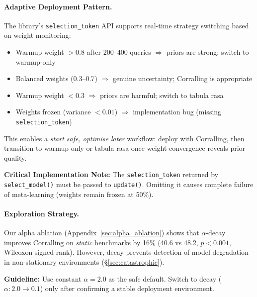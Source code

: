 \paragraph{Adaptive Deployment Pattern.}
The library's \texttt{selection\_token} API supports real-time
strategy switching based on weight monitoring:

\begin{itemize}[nosep]
    \item Warmup weight ${>}0.8$ after 200--400 queries
          $\Rightarrow$ priors are strong; switch to warmup-only
    \item Balanced weights ($0.3$--$0.7$) $\Rightarrow$ genuine
          uncertainty; Corralling is appropriate
    \item Warmup weight ${<}0.3$ $\Rightarrow$ priors are harmful;
          switch to tabula rasa
    \item Weights frozen (variance ${<}0.01$) $\Rightarrow$
          implementation bug (missing \texttt{selection\_token})
\end{itemize}

This enables a \emph{start safe, optimise later} workflow: deploy with
Corralling, then transition to warmup-only or tabula rasa once weight
convergence reveals prior quality.

\textbf{Critical Implementation Note:}
The \texttt{selection\_token} returned by \texttt{select\_model()} must
be passed to \texttt{update()}.  Omitting it causes complete failure of
meta-learning (weights remain frozen at 50\%).

\paragraph{Exploration Strategy.}
Our alpha ablation (Appendix~\ref{sec:alpha_ablation}) shows that
$\alpha$-decay improves Corralling on \emph{static} benchmarks by
16\% (40.6 vs 48.2, $p{<}0.001$, Wilcoxon signed-rank).
However, decay prevents detection of model degradation in
non-stationary environments (\S\ref{sec:catastrophic}).

\textbf{Guideline:}
Use constant $\alpha{=}2.0$ as the safe default.
Switch to decay ($\alpha: 2.0 \to 0.1$) only after confirming a stable
deployment environment.

